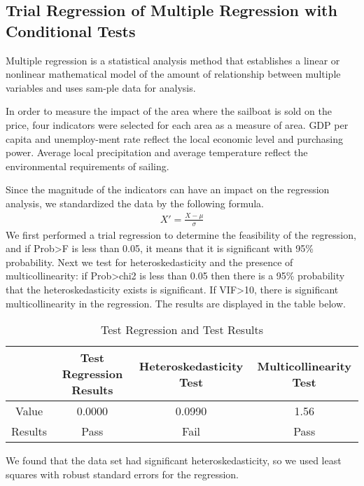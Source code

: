 \subsection{Trial Regression of Multiple Regression with Conditional Tests}
Multiple regression is a statistical analysis method that establishes a linear or nonlinear mathematical model of the amount of relationship between multiple variables and uses sam-ple data for analysis.

In order to measure the impact of the area where the sailboat is sold on the price, four indicators were selected for each area as a measure of area. GDP per capita and unemploy-ment rate reflect the local economic level and purchasing power. Average local precipitation and average temperature reflect the environmental requirements of sailing.

Since the magnitude of the indicators can have an impact on the regression analysis, we standardized the data by the following formula.
\begin{align}
    X'=\frac{X-\mu}{\sigma}
\end{align}
We first performed a trial regression to determine the feasibility of the regression, and if Prob>F is less than 0.05, it means that it is significant with 95\% probability. Next we test for heteroskedasticity and the presence of multicollinearity: if Prob>chi2 is less than 0.05 then there is a 95\% probability that the heteroskedasticity exists is significant. If VIF>10, there is significant multicollinearity in the regression. The results are displayed in the table below.
\vspace{-0.5cm}
\begin{table}[H]
    \begin{center}
    \caption{Test Regression and Test Results}
    \resizebox{\textwidth}{!}
    {\begin{tabular}{c c c c}
    \toprule[2pt]
     &Test Regression Results&Heteroskedasticity Test&Multicollinearity Test\\ %
    \midrule
    Value   & 0.0000 & 0.0990 & 1.56 \\
    Results & Pass   & Fail   & Pass \\
    \bottomrule[2pt]
    \end{tabular}}
    \end{center}
\end{table}
\vspace{-0.5cm}
We found that the data set had significant heteroskedasticity, so we used least squares with robust standard errors for the regression.


